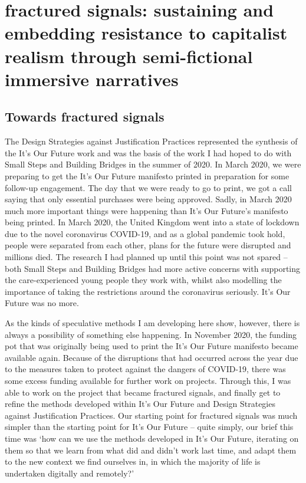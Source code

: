 \chapter{fractured signals: sustaining and embedding resistance to capitalist realism through semi-fictional immersive narratives}
\label{ch:8}

\section{Towards fractured signals}
\label{sec:8-1-fractured}
The Design Strategies against Justification Practices represented the synthesis of the It’s Our Future work and was the basis of the work I had hoped to do with Small Steps and Building Bridges in the summer of 2020. In March 2020, we were preparing to get the It’s Our Future manifesto printed in preparation for some follow-up engagement. The day that we were ready to go to print, we got a call saying that only essential purchases were being approved. Sadly, in March 2020 much more important things were happening than It’s Our Future’s manifesto being printed. In March 2020, the United Kingdom went into a state of lockdown due to the novel coronavirus COVID-19, and as a global pandemic took hold, people were separated from each other, plans for the future were disrupted and millions died.  The research I had planned up until this point was not spared – both Small Steps and Building Bridges had more active concerns with supporting the care-experienced young people they work with, whilst also modelling the importance of taking the restrictions around the coronavirus seriously. It’s Our Future was no more. 



As the kinds of speculative methods I am developing here show, however, there is always a possibility of something else happening. In November 2020, the funding pot that was originally being used to print the It’s Our Future manifesto became available again. Because of the disruptions that had occurred across the year due to the measures taken to protect against the dangers of COVID-19,  there was some excess funding available for further work on projects. Through this, I was able to work on the project that became fractured signals, and finally get to refine the methods developed within It’s Our Future and Design Strategies against Justification Practices. Our starting point for fractured signals was much simpler than the starting point for It’s Our Future – quite simply, our brief this time was ‘how can we use the methods developed in It’s Our Future, iterating on them so that we learn from what did and didn’t work last time, and adapt them to the new context we find ourselves in, in which the majority of life is undertaken digitally and remotely?’


